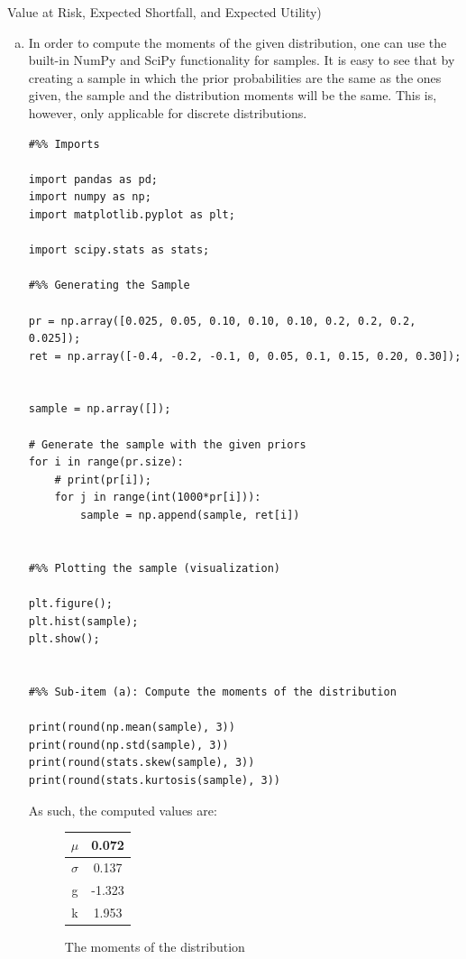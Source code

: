 \documentclass[10pt]{article}
\newenvironment{exercise}[2][Exercise]{\begin{trivlist}
  \item[\hskip \labelsep {\bfseries #1}\hskip \labelsep {\bfseries #2.}]}{\end{trivlist}}
\begin{document}
\begin{exercise}{2}(Value at Risk, Expected Shortfall, and Expected Utility)
  \begin{enumerate}[(a)]
    \item
  In order to compute the moments of the given distribution, one can use the
  built-in \textrm{NumPy} and \textrm{SciPy} functionality for samples. It is
  easy to see that by creating a sample in which the prior probabilities are the
  same as the ones given, the sample and the distribution moments will be the
  same. This is, however, only applicable for discrete distributions.
  \begin{lstlisting}
#%% Imports

import pandas as pd;
import numpy as np;
import matplotlib.pyplot as plt;

import scipy.stats as stats;

#%% Generating the Sample

pr = np.array([0.025, 0.05, 0.10, 0.10, 0.10, 0.2, 0.2, 0.2, 0.025]);
ret = np.array([-0.4, -0.2, -0.1, 0, 0.05, 0.1, 0.15, 0.20, 0.30]);


sample = np.array([]);

# Generate the sample with the given priors
for i in range(pr.size):
    # print(pr[i]);
    for j in range(int(1000*pr[i])):
        sample = np.append(sample, ret[i])


#%% Plotting the sample (visualization)

plt.figure();
plt.hist(sample);
plt.show();


#%% Sub-item (a): Compute the moments of the distribution

print(round(np.mean(sample), 3))
print(round(np.std(sample), 3))
print(round(stats.skew(sample), 3))
print(round(stats.kurtosis(sample), 3))
  \end{lstlisting}
  As such, the computed values are:

  \begin{figure}[H]
    \centering
    \begin{tabular}{|c | c |}
      \hline
      $\mu$ & 0.072 \\ \hline
      $\sigma$ & 0.137 \\ \hline
      g & -1.323 \\ \hline
      k &  1.953 \\\hline
    \end{tabular}
    \caption{The moments of the distribution}
  \end{figure}


\end{enumerate}
\end{exercise}
\end{document}
